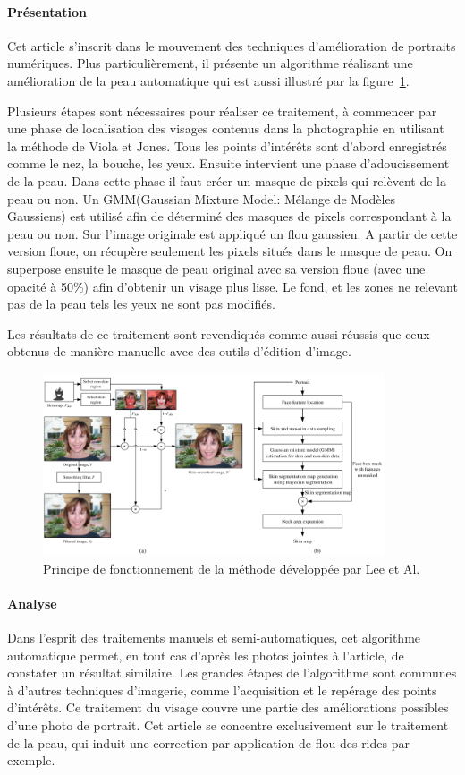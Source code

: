 \documentclass[11pt, french,screen]{report-rd-info}
\begin{document}
\paragraph{Présentation}
Cet article s'inscrit dans le mouvement des techniques d'amélioration de portraits numériques.
Plus particulièrement, il présente un algorithme réalisant une amélioration de la peau automatique qui est aussi illustré par la figure~\ref{fig:FonctionnementLee}.

Plusieurs étapes sont nécessaires pour réaliser ce traitement, à commencer par une phase de localisation des visages contenus dans la photographie en utilisant la méthode de Viola et Jones.
Tous les points d'intérêts sont d'abord enregistrés comme le nez, la bouche, les yeux.
Ensuite intervient une phase d'adoucissement de la peau.
Dans cette phase il faut créer un masque de pixels qui relèvent de la peau ou non.
Un GMM(Gaussian Mixture Model: Mélange de Modèles Gaussiens) est utilisé afin de déterminé des masques de pixels correspondant à la peau ou non.
Sur l’image originale est appliqué un flou gaussien. A partir de cette version floue, on récupère seulement les pixels situés dans le masque de peau. On superpose ensuite le masque de peau original avec sa version floue (avec une opacité à 50\%) afin d’obtenir un visage plus lisse. Le fond, et les zones ne relevant pas de la peau tels les yeux ne sont pas modifiés.

Les résultats de ce traitement sont revendiqués comme aussi réussis que ceux obtenus de manière manuelle avec des outils d'édition d'image.
\begin{figure}
	\centering
\includegraphics[width=0.9\textwidth]{Images/ea_algo_smoothing}
	\caption{Principe de fonctionnement de la méthode développée par Lee et Al.\cite{Lee}}
	\label{fig:FonctionnementLee}
\end{figure}
\paragraph{Analyse}
Dans l'esprit des traitements manuels et semi-automatiques, cet algorithme automatique permet, en tout cas d'après les photos jointes à l'article, de constater un résultat similaire.
Les grandes étapes de l'algorithme sont communes à d'autres techniques d'imagerie, comme l'acquisition et le repérage des points d'intérêts.
Ce traitement du visage couvre une partie des améliorations possibles d'une photo de portrait. Cet article se concentre exclusivement sur le traitement de la peau, qui induit une correction par application de flou des rides par exemple.
\end{document}
